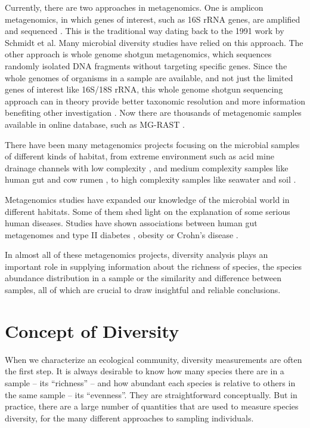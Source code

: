 Currently, there are two approaches in metagenomics. One is amplicon
metagenomics, in which genes of interest, such as 16S rRNA genes, are amplified
and sequenced \cite{Sogin:2006aa}. This is the traditional way dating back to
the 1991 work by Schmidt et al. Many microbial diversity studies have relied on
this approach. The other approach is whole genome shotgun metagenomics, which
sequences randomly isolated DNA fragments without targeting specific genes.
Since the whole genomes of organisms in a sample are available, and not just
the limited genes of interest like 16S/18S rRNA, this whole genome shotgun
sequencing approach can in theory provide better taxonomic resolution and more
information benefiting other investigation \cite{Tyson:2004aa}
\cite{Qin:2010aa}.  Now there are thousands of metagenomic samples available in
online database, such as MG-RAST \cite{Glass:2010aa}.

There have been many metagenomics projects focusing on the microbial samples of
different kinds of habitat, from extreme environment such as acid mine drainage
channels with low complexity \cite{Tyson:2004aa}, and medium complexity samples
like human gut \cite{Qin:2010aa} and cow rumen \cite{Hess:2011aa}, to high
complexity samples like seawater \cite{Venter:2004aa} and soil
\cite{Gilbert:2010aa}.

Metagenomics studies have expanded our knowledge of the microbial world in
different habitats. Some of them shed light on the explanation of some serious
human diseases. Studies have shown associations between human gut metagenomes
and type II diabetes \cite{Qin:2012aa}, obesity \cite{Turnbaugh:2009aa,
Kau:2011aa} or Crohn's disease \cite{Morgan:2012aa}.

In almost all of these metagenomics projects, diversity analysis plays an
important role in supplying information about the richness of species, the
species abundance distribution in a sample or the similarity and difference
between samples, all of which are crucial to draw insightful and reliable
conclusions.




\section{Concept of Diversity} When we characterize an ecological community,
diversity measurements are often the first step. It is always desirable to know
how many species there are in a sample -- its ``richness'' -- and how abundant
each species is relative to others in the same sample -- its ``evenness''. They
are straightforward conceptually. But in practice, there are a large number of
quantities that are used to measure species diversity, for the many different
approaches to sampling individuals.

